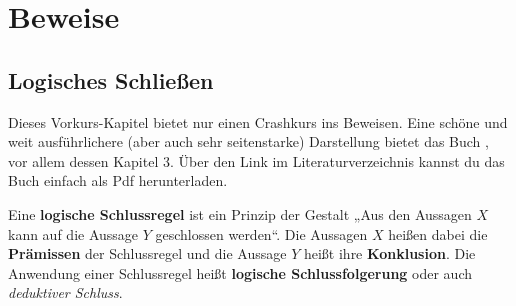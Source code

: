 


    
\chapter{Beweise}


\section{Logisches Schließen}


\begin{bem}[Buchtipp]
    Dieses Vorkurs-Kapitel bietet nur einen Crashkurs ins Beweisen. Eine schöne und weit ausführlichere (aber auch sehr seitenstarke) Darstellung bietet das Buch \cite{Vel06}, vor allem dessen Kapitel 3. Über den Link im Literaturverzeichnis kannst du das Buch einfach als Pdf herunterladen.
\end{bem}


\begin{de}  \label{schlussregel}
    Eine \textbf{logische Schlussregel} ist ein Prinzip der Gestalt „Aus den Aussagen $X$ kann auf die Aussage $Y$ geschlossen werden“. Die Aussagen $X$ heißen dabei die \textbf{Prämissen} der Schlussregel und die Aussage $Y$ heißt ihre \textbf{Konklusion}. Die Anwendung einer Schlussregel heißt \textbf{logische Schlussfolgerung} oder auch \emph{deduktiver Schluss}.
\end{de}


